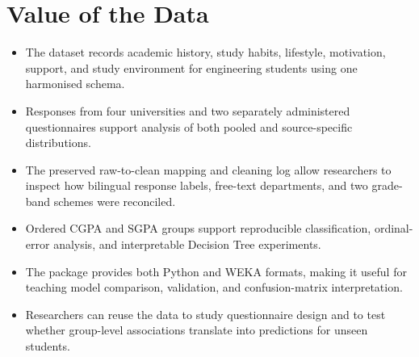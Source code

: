 \section{Value of the Data}
\begin{itemize}
\item The dataset records academic history, study habits, lifestyle, motivation, support, and study environment for engineering students using one harmonised schema.
\item Responses from four universities and two separately administered questionnaires support analysis of both pooled and source-specific distributions.
\item The preserved raw-to-clean mapping and cleaning log allow researchers to inspect how bilingual response labels, free-text departments, and two grade-band schemes were reconciled.
\item Ordered CGPA and SGPA groups support reproducible classification, ordinal-error analysis, and interpretable Decision Tree experiments.
\item The package provides both Python and WEKA formats, making it useful for teaching model comparison, validation, and confusion-matrix interpretation.
\item Researchers can reuse the data to study questionnaire design and to test whether group-level associations translate into predictions for unseen students.
\end{itemize}

